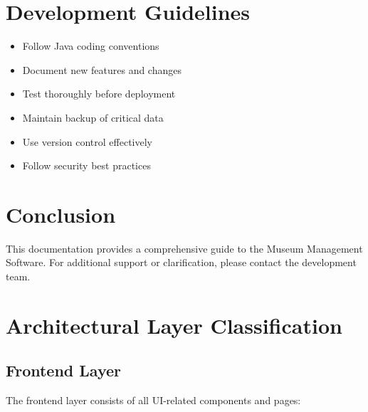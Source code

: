 \documentclass[12pt,a4paper]{article}
\begin{document}
\section{Development Guidelines}
\begin{itemize}
    \item Follow Java coding conventions
    \item Document new features and changes
    \item Test thoroughly before deployment
    \item Maintain backup of critical data
    \item Use version control effectively
    \item Follow security best practices
\end{itemize}

\section{Conclusion}
This documentation provides a comprehensive guide to the Museum Management Software. For additional support or clarification, please contact the development team.

\section{Architectural Layer Classification}

\subsection{Frontend Layer}
The frontend layer consists of all UI-related components and pages:
\end{document}
